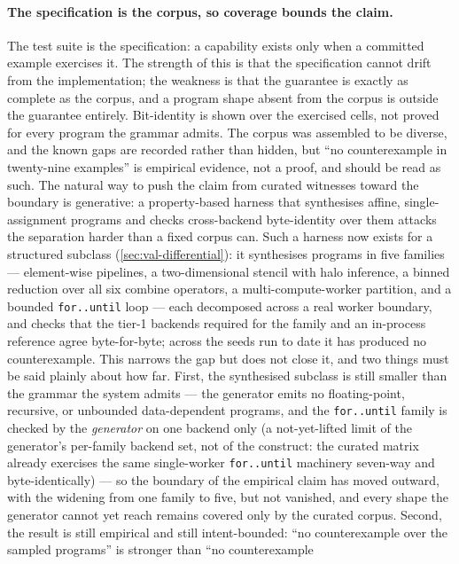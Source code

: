 \paragraph{The specification is the corpus, so coverage bounds the claim.} The
test suite is the specification: a capability exists only when a committed example
exercises it. The strength of this is that the specification cannot drift from the
implementation; the weakness is that the guarantee is exactly as complete as the
corpus, and a program shape absent from the corpus is outside the guarantee
entirely. Bit-identity is shown over the exercised cells, not proved for every
program the grammar admits. The corpus was assembled to be diverse, and the known
gaps are recorded rather than hidden, but ``no counterexample in twenty-nine
examples'' is empirical evidence, not a proof, and should be read as such. The
natural way to push the claim from curated witnesses toward the boundary is
generative: a property-based harness that synthesises affine, single-assignment
programs and checks cross-backend byte-identity over them attacks the separation
harder than a fixed corpus can. Such a harness now exists for a structured subclass
(\cref{sec:val-differential}): it synthesises programs in five families --- element-wise
pipelines, a two-dimensional stencil with halo inference, a binned reduction over all
six combine operators, a multi-compute-worker partition, and a bounded
\texttt{for..until} loop --- each decomposed across a real worker boundary, and checks
that the tier-1 backends required for the family and an in-process reference agree
byte-for-byte; across the seeds run to date it has produced no counterexample. This
narrows the gap but does not close it, and two things must be said plainly about how
far. First, the synthesised subclass is still smaller than the grammar the system
admits --- the generator emits no floating-point, recursive, or unbounded
data-dependent programs, and the \texttt{for..until} family is checked by the
\emph{generator} on one backend only (a not-yet-lifted limit of the generator's
per-family backend set, not of the construct: the curated matrix already exercises the
same single-worker \texttt{for..until} machinery seven-way and byte-identically)
--- so the boundary of the empirical claim has moved outward, with the widening from one
family to five, but not vanished, and every shape the generator cannot yet reach remains
covered only by the curated corpus. Second, the result is still empirical and still intent-bounded:
``no counterexample over the sampled programs'' is stronger than ``no counterexample
